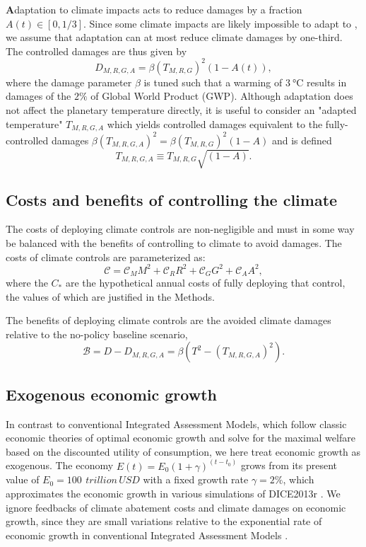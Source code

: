 \documentclass[9pt,twocolumn,twoside,lineno]{pnas-new}
\begin{document}
\textbf{A}daptation to climate impacts acts to reduce damages by a fraction $A(t) \in [0, 1/3]$. Since some climate impacts are likely impossible to adapt to \cite[][]{sherwood_adaptability_2010}, we assume that adaptation can at most reduce climate damages by one-third. The controlled damages are thus given by
\begin{equation}
    D_{M,R,G,A} = \beta (T_{M,R,G})^{2} (1-A(t)),
    \label{eq:damages}
\end{equation}
where the damage parameter $\beta$ is tuned such that a warming of $\SI{3}{\celsius}$ results in damages of the $2\%$ of Global World Product (GWP). Although adaptation does not affect the planetary temperature directly, it is useful to consider an "adapted temperature" $T_{M,R,G,A}$ which yields controlled damages equivalent to the fully-controlled damages $\beta (T_{M,R,G,A})^{2} = \beta (T_{M,R,G})^{2} (1-A)$ and is defined
\begin{equation}
    T_{M,R,G,A} \equiv T_{M,R,G} \sqrt{(1-A)}.\label{eq.adapted_temperature}
\end{equation}

\subsection*{Costs and benefits of controlling the climate}

The costs of deploying climate controls are non-negligible and must in some way be balanced with the benefits of controlling to climate to avoid damages. The costs of climate controls are parameterized as:
\begin{equation}
    \mathcal{C} = \mathcal{C}_{M} M^{2} + \mathcal{C}_{R} R^{2} + \mathcal{C}_{G} G^{2} + \mathcal{C}_{A} A^{2},
\end{equation}
where the $C_{*}$ are the hypothetical annual costs of fully deploying that control, the values of which are justified in the Methods.

The benefits of deploying climate controls are the avoided climate damages relative to the no-policy baseline scenario,
\begin{equation}
    \mathcal{B} = D - D_{M,R,G,A} = \beta (T^{2} - (T_{M,R,G,A})^{2}).
\end{equation}

\subsection*{Exogenous economic growth}
In contrast to conventional Integrated Assessment Models, which follow classic economic theories of optimal economic growth and solve for the maximal welfare based on the discounted utility of consumption, we here treat economic growth as exogenous. The economy $E(t) = E_{0}(1 + \gamma)^{(t-t_{0})}$ grows from its present value of $E_{0} = \SI{100}{\,trillion\, USD}$ with a fixed growth rate $\gamma = 2\%$, which approximates the economic growth in various simulations of DICE2013r \cite{nordhaus2013dice}. We ignore feedbacks of climate abatement costs and climate damages on economic growth, since they are small variations relative to the exponential rate of economic growth in conventional Integrated Assessment Models \cite{nordhaus2013dice}.
\end{document}
